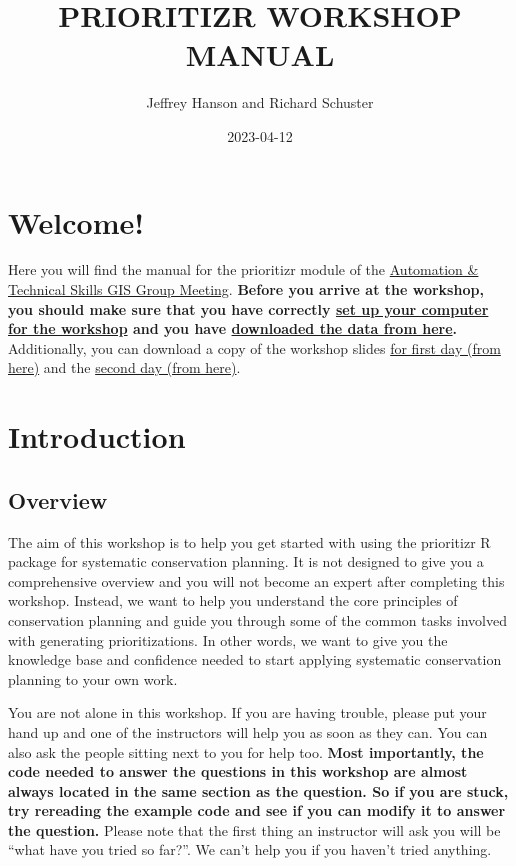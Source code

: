 \documentclass[
  12pt,
]{book}
\title{PRIORITIZR WORKSHOP MANUAL}
\author{Jeffrey Hanson and Richard Schuster}
\date{2023-04-12}
\begin{document}
\maketitle

{
\hypersetup{linkcolor=}
\setcounter{tocdepth}{0}
\tableofcontents
}
\hypertarget{welcome}{%
\chapter{Welcome!}\label{welcome}}

Here you will find the manual for the prioritizr module of the \href{https://prioritizr.github.io/NCC-workshop/}{Automation \& Technical Skills GIS Group Meeting}. \textbf{Before you arrive at the workshop, you should make sure that you have correctly \protect\hyperlink{setup}{set up your computer for the workshop} and you have \href{https://github.com/prioritizr/NCC-workshop/raw/main/data.zip}{downloaded the data from here}.} Additionally, you can download a copy of the workshop slides \href{https://github.com/prioritizr/NCC-workshop/raw/main/slides-day-1.pptx}{for first day (from here)} and the \href{https://github.com/prioritizr/NCC-workshop/raw/main/slides-day-2.pptx}{second day (from here)}.

\hypertarget{introduction}{%
\chapter{Introduction}\label{introduction}}

\hypertarget{overview}{%
\section{Overview}\label{overview}}

The aim of this workshop is to help you get started with using the prioritizr R package for systematic conservation planning. It is not designed to give you a comprehensive overview and you will not become an expert after completing this workshop. Instead, we want to help you understand the core principles of conservation planning and guide you through some of the common tasks involved with generating prioritizations. In other words, we want to give you the knowledge base and confidence needed to start applying systematic conservation planning to your own work.

You are not alone in this workshop. If you are having trouble, please put your hand up and one of the instructors will help you as soon as they can. You can also ask the people sitting next to you for help too. \textbf{Most importantly, the code needed to answer the questions in this workshop are almost always located in the same section as the question. So if you are stuck, try rereading the example code and see if you can modify it to answer the question.} Please note that the first thing an instructor will ask you will be ``what have you tried so far?''. We can't help you if you haven't tried anything.
\end{document}
